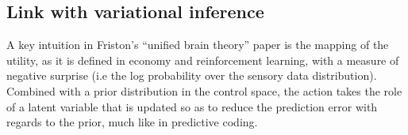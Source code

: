 \documentclass[runningheads]{llncs}
\begin{document}




\subsection{Link with variational inference}
A key intuition in Friston's  ``unified brain theory'' paper \cite{friston2010free} is the mapping of the utility, as it is defined in economy and reinforcement learning, with a measure of negative surprise (i.e the log probability over the sensory data distribution). Combined with a prior distribution in the control space, the action takes the role of a latent variable that is updated so as to reduce the prediction error with regards to the prior, much like in predictive coding. 
\end{document}
